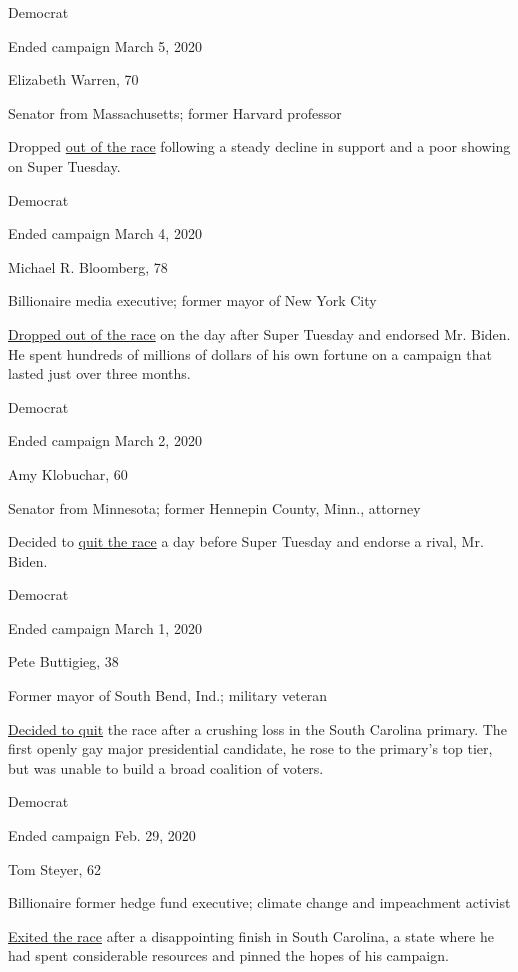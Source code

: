 Democrat

Ended campaign March 5, 2020

Elizabeth Warren, 70

Senator from Massachusetts; former Harvard professor

Dropped
\href{https://www.nytimes.com/2020/03/05/us/politics/elizabeth-warren-drops-out.html}{out
of the race} following a steady decline in support and a poor showing on
Super Tuesday.

Democrat

Ended campaign March 4, 2020

Michael R. Bloomberg, 78

Billionaire media executive; former mayor of New York City

\href{https://www.nytimes.com/2020/03/04/us/politics/michael-bloomberg-drops-out.html}{Dropped
out of the race} on the day after Super Tuesday and endorsed Mr. Biden.
He spent hundreds of millions of dollars of his own fortune on a
campaign that lasted just over three months.

Democrat

Ended campaign March 2, 2020

Amy Klobuchar, 60

Senator from Minnesota; former Hennepin County, Minn., attorney

Decided to
\href{https://www.nytimes.com/2020/03/02/us/politics/amy-klobuchar-drops-out.html}{quit
the race} a day before Super Tuesday and endorse a rival, Mr. Biden.

Democrat

Ended campaign March 1, 2020

Pete Buttigieg, 38

Former mayor of South Bend, Ind.; military veteran

\href{https://www.nytimes.com/2020/03/01/us/politics/pete-buttigieg-drops-out.html}{Decided
to quit} the race after a crushing loss in the South Carolina primary.
The first openly gay major presidential candidate, he rose to the
primary's top tier, but was unable to build a broad coalition of voters.

Democrat

Ended campaign Feb. 29, 2020

Tom Steyer, 62

Billionaire former hedge fund executive; climate change and impeachment
activist

\href{https://www.nytimes.com/2020/02/29/us/politics/tom-steyer-drops-out.html}{Exited
the race} after a disappointing finish in South Carolina, a state where
he had spent considerable resources and pinned the hopes of his
campaign.

